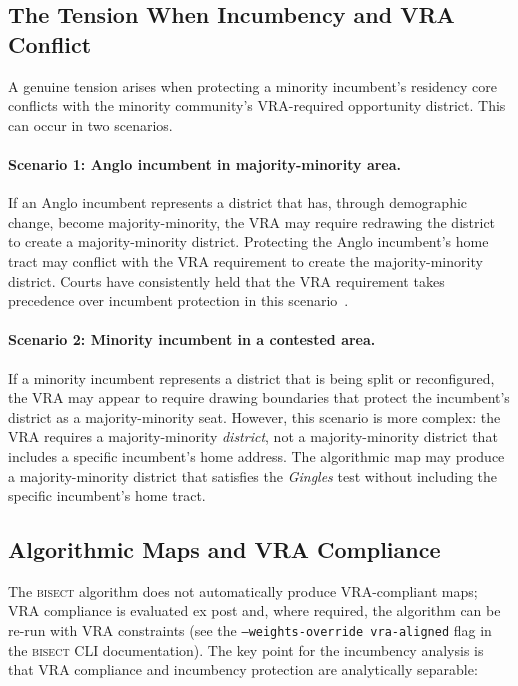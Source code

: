 \subsection{The Tension When Incumbency and VRA Conflict}

A genuine tension arises when protecting a minority incumbent's residency core
conflicts with the minority community's VRA-required opportunity district. This can
occur in two scenarios.

\paragraph{Scenario 1: Anglo incumbent in majority-minority area.}
If an Anglo incumbent represents a district that has, through demographic change,
become majority-minority, the VRA may require redrawing the district to create a
majority-minority district. Protecting the Anglo incumbent's home tract may conflict
with the VRA requirement to create the majority-minority district. Courts have
consistently held that the VRA requirement takes precedence over incumbent protection
in this scenario~\citep{thornburg1986progress}.

\paragraph{Scenario 2: Minority incumbent in a contested area.}
If a minority incumbent represents a district that is being split or reconfigured, the
VRA may appear to require drawing boundaries that protect the incumbent's district as
a majority-minority seat. However, this scenario is more complex: the VRA requires
a majority-minority \textit{district}, not a majority-minority district that includes
a specific incumbent's home address. The algorithmic map may produce a majority-minority
district that satisfies the \textit{Gingles} test without including the specific
incumbent's home tract.

\subsection{Algorithmic Maps and VRA Compliance}

The \textsc{bisect} algorithm does not automatically produce VRA-compliant maps;
VRA compliance is evaluated ex post and, where required, the algorithm can be
re-run with VRA constraints (see the \texttt{--weights-override vra-aligned} flag
in the \textsc{bisect} CLI documentation). The key point for the incumbency analysis
is that VRA compliance and incumbency protection are analytically separable:

